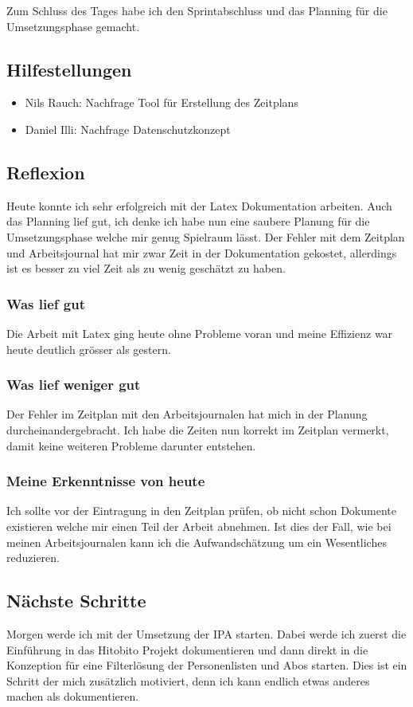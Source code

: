 Zum Schluss des Tages habe ich den Sprintabschluss und das Planning für die Umsetzungsphase
gemacht. 

\newpage

\subsection*{Hilfestellungen}
\begin{itemize}
    \item Nils Rauch: Nachfrage Tool für Erstellung des Zeitplans
    \item Daniel Illi: Nachfrage Datenschutzkonzept
\end{itemize}

\subsection*{Reflexion}
Heute konnte ich sehr erfolgreich mit der Latex Dokumentation arbeiten. Auch das Planning
lief gut, ich denke ich habe nun eine saubere Planung für die Umsetzungsphase welche mir genug
Spielraum lässt. Der Fehler mit dem Zeitplan und Arbeitsjournal hat mir zwar Zeit in der Dokumentation gekostet,
allerdings ist es besser zu viel Zeit als zu wenig geschätzt zu haben. 

\subsubsection*{Was lief gut}
Die Arbeit mit Latex ging heute ohne Probleme voran und meine Effizienz war heute deutlich grösser 
als gestern.

\subsubsection*{Was lief weniger gut}
Der Fehler im Zeitplan mit den Arbeitsjournalen hat mich in der Planung durcheinandergebracht.
Ich habe die Zeiten nun korrekt im Zeitplan vermerkt, damit keine weiteren Probleme darunter entstehen.

\subsubsection*{Meine Erkenntnisse von heute}
Ich sollte vor der Eintragung in den Zeitplan prüfen, ob nicht schon Dokumente existieren welche mir
einen Teil der Arbeit abnehmen. Ist dies der Fall, wie bei meinen Arbeitsjournalen kann ich die Aufwandschätzung um 
ein Wesentliches reduzieren.

\newpage

\subsection*{Nächste Schritte}
Morgen werde ich mit der Umsetzung der IPA starten. Dabei werde ich zuerst die Einführung in das Hitobito
Projekt dokumentieren und dann direkt in die Konzeption für eine Filterlösung der Personenlisten und Abos starten.
Dies ist ein Schritt der mich zusätzlich motiviert, denn ich kann endlich etwas anderes machen als dokumentieren.

\pagebreak
